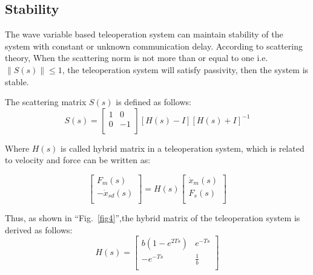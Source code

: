 \subsection{Stability}
The wave variable based teleoperation system can
maintain stability of the system with constant or unknown communication delay.
According to scattering theory\cite{b7},
When the scattering norm is not more than or equal to one i.e.$\left\| S(s) \right\|\le 1$,
the teleoperation system will satisfy passivity, then the system is stable.
\par The scattering matrix $S(s)$ is defined as follows:
\begin{equation}
    S(s)=\left[ \begin{matrix}
            1 & 0  \\
            0 & -1 \\
        \end{matrix} \right]\left[ H(s)-I \right]{{\left[ H(s)+I \right]}^{-1}}\label{eq15}
\end{equation}
\par Where $H(s)$ is called hybrid matrix in a teleoperation system, 
which is related to velocity and force can be written as:

\begin{equation}
    \left[ \begin{matrix}
            {{F}_{m}}(s)           \\
            -{{{\dot{x}}}_{sd}}(s) \\
        \end{matrix} \right]=H(s)\left[ \begin{matrix}
            {{{\dot{x}}}_{m}}(s) \\
            {{F}_{s}}(s)         \\
        \end{matrix} \right]\label{eq16}
\end{equation}
\par Thus, as shown in ``Fig.~\ref{fig4}'',the hybrid matrix of the teleoperation system  is derived as follows:
\begin{equation}
    H(s)=\left[ \begin{matrix}
            b(1-{{e}^{2Ts}}) & {{e}^{-Ts}} \\
            -{{e}^{-Ts}}     & \frac{1}{b} \\
        \end{matrix} \right] \label{eq17}
\end{equation}

